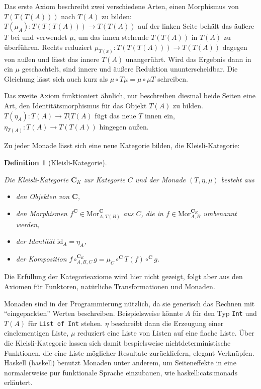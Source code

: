 \documentclass[11pt, a4paper, bibgerm]{scrbook}
\newcommand\icode[1]{\lstinline?#1?}
\newcommand\sref{}
\newcommand\ato{\rightarrow} %
\newtheorem{defini}{Definition}
\newcommand{\defi}[2]{%
  \begin{defini}[#1]
    \label{def:#1}
    #2
  \end{defini}
}
\begin{document}
Das erste Axiom beschreibt zwei verschiedene Arten, einen Morphismus von
$T(T(T(A)))$ nach $T(A)$ zu bilden: $T(\mu_A):T(T(T(A))) \ato T(T(A))$
auf der linken Seite behält das äußere $T$ bei und verwendet $\mu$, um
das innen stehende $T(T(A))$ in $T(A)$ zu überführen. Rechts reduziert
$\mu_{T(x)}:T(T(T(A))) \ato T(T(A))$ dagegen von außen und lässt das
innere $T(A)$ unangerührt. Wird das Ergebnis dann in ein $\mu$
geschachtelt, sind innere und äußere Reduktion ununterscheidbar. Die
Gleichung lässt sich auch kurz als $\mu \circ T \mu = \mu \circ \mu T$
schreiben.

Das zweite Axiom funktioniert ähnlich, nur beschreiben diesmal beide
Seiten eine Art, den Identitätsmorphismus für das Objekt $T(A)$ zu
bilden. $T(\eta_A):T(A) \ato T(T(A)$ fügt das neue $T$ innen ein,
$\eta_{T(A)}:T(A) \ato T(T(A))$ hingegen außen.

Zu jeder Monade lässt sich eine neue Kategorie bilden, die Kleisli-Kategorie:
\defi{Kleisli-Kategorie}{
Die Kleisli-Kategorie $\mathbf{C}_K$ zur Kategorie $C$ und der
Monade $(T,\eta,\mu)$ besteht aus
\begin{itemize}
\item den Objekten von $\mathbf{C}$,
\item den Morphismen $f^{\mathbf{C}} \in
  \mathrm{Mor}^{\mathbf{C}}_{A,T(B)}$ aus $C$, die in $f \in
  \mathrm{Mor}^{\mathbf{C}_K}_{A,B}$ umbenannt werden,
\item der Identität $\mathrm{id}_A = \eta_A$,
\item der Komposition $f \circ^{\mathbf{C}_K}_{A,B,C} g = \mu_C
  \circ^{\mathbf{C}} T(f) \circ^{\mathbf{C}} g$.
\end{itemize}
}
Die Erfüllung der Kategorieaxiome wird hier nicht gezeigt, folgt aber
aus den Axiomen für Funktoren, natürliche Transformationen und Monaden.

Monaden sind in der Programmierung nützlich, da sie generisch das
Rechnen mit "`eingepackten"' Werten beschreiben. Beispielsweise könnte
$A$ für den Typ \icode{Int} und $T(A)$ für \icode{List of Int}
stehen. $\eta$ beschreibt dann die Erzeugung einer einelementigen Liste,
$\mu$ reduziert eine Liste von Listen auf eine flache Liste. Über die
Kleisli-Kategorie lassen sich damit bespielsweise nichtdeterministische
Funktionen, die eine Liste möglicher Resultate zurückliefern, elegant
Verknüpfen. Haskell (\sref{haskell}) benutzt Monaden unter
anderem, um Seiteneffekte in eine normalerweise pur funktionale Sprache
einzubauen, wie \sref{haskell:cats:monads} erläutert.
\end{document}
